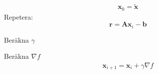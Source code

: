 \documentclass{article}
\begin{document}
\begin{gather*}
    \mathbf{x}_0 = \mathbf{\tilde{x} }
\end{gather*}
Repetera:
\begin{equation*}
    \mathbf{r} = \mathbf{A}\mathbf{x}_i - \mathbf{b}
\end{equation*}

    Beräkna $\gamma $

    Beräkna $\nabla f$
\begin{gather*}
        \mathbf{x}_{i+1} = \mathbf{x}_i + \gamma \nabla f 
\end{gather*}
\end{document}
